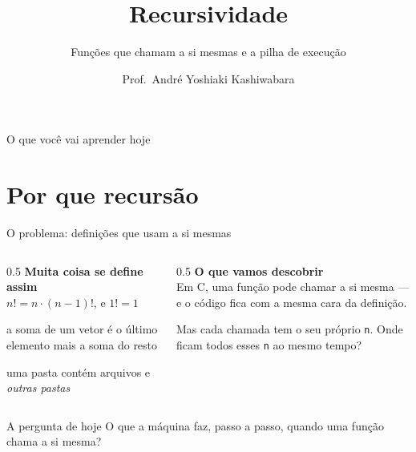 \documentclass[aspectratio=169]{beamer}
\title{Recursividade}
\subtitle{Funções que chamam a si mesmas e a pilha de execução}
\author{Prof.\ André Yoshiaki Kashiwabara}
\institute{DCOMP -- Universidade Federal de Sergipe\\
\texttt{andreyoshiaki@dcomp.ufs.br}}
\date{}
\begin{document}
\begin{frame}[plain]
  \titlepage
\end{frame}

\begin{frame}{O que você vai aprender hoje}
  \begin{center}
  \end{center}
\end{frame}

\section{Por que recursão}

\begin{frame}{O problema: definições que usam a si mesmas}
  \begin{columns}[T]
    \begin{column}{0.5\textwidth}
      \textbf{Muita coisa se define assim}\\[0.3em]
      \small
      $n! = n \cdot (n-1)!$, \quad e $1! = 1$

      \medskip
      a soma de um vetor é o último elemento mais a soma do resto

      \medskip
      uma pasta contém arquivos e \emph{outras pastas}
    \end{column}
    \begin{column}{0.5\textwidth}
      \textbf{O que vamos descobrir}\\[0.3em]
      \small
      Em C, uma função pode chamar a si mesma --- e o código fica com a
      mesma cara da definição.

      \medskip
      Mas cada chamada tem o seu próprio \texttt{n}. \textcolor{UFSRed}{Onde
      ficam todos esses \texttt{n} ao mesmo tempo?}
    \end{column}
  \end{columns}
  \begin{block}{A pergunta de hoje}
    O que a máquina faz, passo a passo, quando uma função chama a si mesma?
  \end{block}
\end{frame}
\end{document}
